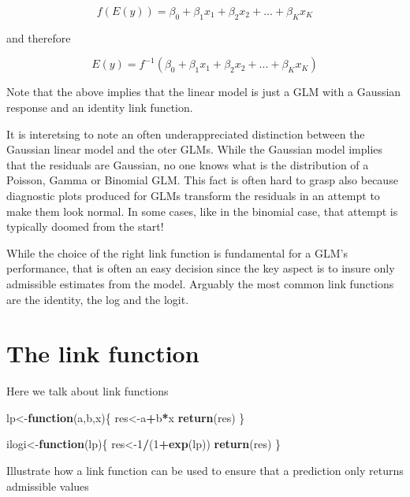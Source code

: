 \documentclass[
]{book}
\newenvironment{Shaded}{\begin{snugshade}}{\end{snugshade}}
\newcommand{\ControlFlowTok}[1]{\textcolor[rgb]{0.13,0.29,0.53}{\textbf{#1}}}
\newcommand{\DecValTok}[1]{\textcolor[rgb]{0.00,0.00,0.81}{#1}}
\newcommand{\KeywordTok}[1]{\textcolor[rgb]{0.13,0.29,0.53}{\textbf{#1}}}
\newcommand{\NormalTok}[1]{#1}
\newcommand{\OperatorTok}[1]{\textcolor[rgb]{0.81,0.36,0.00}{\textbf{#1}}}
\begin{document}
\[f(E(y))=\beta_0+\beta_1x_1+\beta_2x_2+...+\beta_Kx_K\]

and therefore

\[E(y)=f^{-1}(\beta_0+\beta_1x_1+\beta_2x_2+...+\beta_Kx_K)\]

Note that the above implies that the linear model is just a GLM with a Gaussian response and an identity link function.

It is interetsing to note an often underappreciated distinction between the Gaussian linear model and the oter GLMs. While the Gaussian model implies that the residuals are Gaussian, no one knows what is the distribution of a Poisson, Gamma or Binomial GLM. This fact is often hard to grasp also because diagnostic plots produced for GLMs transform the residuals in an attempt to make them look normal. In some cases, like in the binomial case, that attempt is typically doomed from the start!

While the choice of the right link function is fundamental for a GLM's performance, that is often an easy decision since the key aspect is to insure only admissible estimates from the model. Arguably the most common link functions are the identity, the log and the logit.

\hypertarget{the-link-function}{%
\section{The link function}\label{the-link-function}}

Here we talk about link functions

\begin{Shaded}
\begin{Highlighting}[]
\NormalTok{lp<-}\ControlFlowTok{function}\NormalTok{(a,b,x)\{}
\NormalTok{  res<-a}\OperatorTok{+}\NormalTok{b}\OperatorTok{*}\NormalTok{x}
  \KeywordTok{return}\NormalTok{(res)}
\NormalTok{\}}

\NormalTok{ilogi<-}\ControlFlowTok{function}\NormalTok{(lp)\{}
\NormalTok{  res<-}\DecValTok{1}\OperatorTok{/}\NormalTok{(}\DecValTok{1}\OperatorTok{+}\KeywordTok{exp}\NormalTok{(lp))}
  \KeywordTok{return}\NormalTok{(res)}
\NormalTok{\}}
\end{Highlighting}
\end{Shaded}

Illustrate how a link function can be used to ensure that a prediction only returns admissible values
\end{document}
